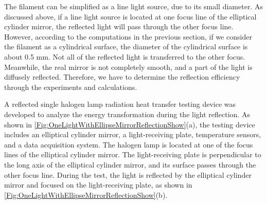 
The filament can be simplified as a line light source, due to its small diameter. As discussed above, if a line light source is located at one focus line of the elliptical cylinder mirror, the reflected light will pass through the other focus line.
However, according to the computations in the previous section, if we consider the filament as a cylindrical surface, the diameter of the cylindrical surface is about 0.5 mm. Not all of the reflected light is transferred to the other focus.
Meanwhile, the real mirror is not completely smooth, and a part of the light is diffusely reflected. Therefore, we have to determine the reflection efficiency through the experiments and calculations.

A reflected single halogen lamp radiation heat transfer testing device was developed to analyze the energy transformation during the light reflection.
As shown in \ref{Fig:OneLightWithEllipseMirrorReflectionShow}(a), the testing device includes an elliptical cylinder mirror, a light-receiving plate, temperature sensors, and a data acquisition system.
The halogen lamp is located at one of the focus lines of the elliptical cylinder mirror. The light-receiving plate is perpendicular to the long axis of the elliptical cylinder mirror, and its surface passes through the other focus line. During the test, the light is reflected by the elliptical cylinder mirror and focused on the light-receiving plate, as shown in \ref{Fig:OneLightWithEllipseMirrorReflectionShow}(b).

